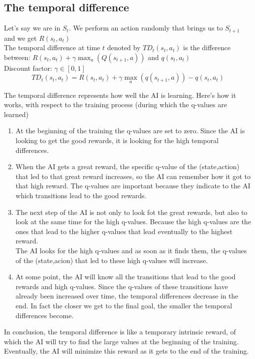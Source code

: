 \documentclass[french]{article}
\begin{document}
\subsection{The temporal difference}
Let's say we are in $S_t$. We perform an action randomly that brings us to $S_{t+1}$ and we get $R(s_t, a_t)$\\
The temporal difference at time $t$ denoted by $TD_t(s_t,a_t)$ is the difference between: $R(s_t,a_t) + \gamma \max_a(Q(s_{t+1},a))$ and $q(s_t,a_t)$\\

Discount factor: $\gamma \in [0,1]$\\

\[TD_t(s_t,a_t) = R(s_t,a_t) + \gamma \max_a(q(s_{t+1},a))- q(s_t,a_t)\]

The temporal difference represents how well the AI is learning. Here's how it works, with respect to the training process (during which the q-values are learned)

\begin{enumerate}
	\item At the beginning of the training the q-values are set to zero. Since the AI is looking to get the good rewards, it is looking for the high temporal differences.
	\item When the AI gets a great reward, the specific q-value of the (state,action) that led to that great reward increases, so the AI can remember how it got to that high reward. The q-values are important because they indicate to the AI which transitions lead to the good rewards.
	\item The next step of the AI is not only to look fot the great rewards, but also to look at the same time for the high q-values. Because the high q-values are the ones that lead to the higher q-values that lead eventually to the highest reward.\\
The AI looks for the high q-values and as soon as it finds them, the q-values of the (state,acion) that led to these high q-values will increase.
	\item At some point, the AI will know all the transitions that lead to the good rewards and high q-values. Since the q-values of these transitions have already been increased over time, the temporal differences decrease in the end. In fact the closer we get to the final goal, the smaller the temporal differences become.
\end{enumerate}
In conclusion, the temporal difference is like a temporary intrinsic reward, of which the AI will try to find the large values at the beginning of the training. Eventually, the AI will minimize this reward as it gets to the end of the training.
\end{document}
